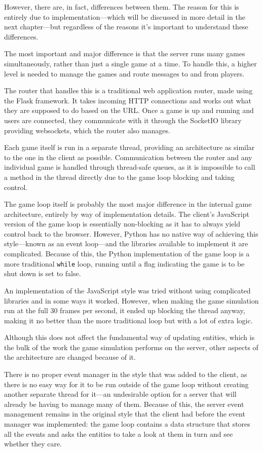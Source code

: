 However, there are, in fact, differences between them. The reason for this is entirely due to implementation---which will be discussed in more detail in the next chapter---but regardless of the reasons it's important to understand these differences.

The most important and major difference is that the server runs many games simultaneously, rather than just a single game at a time. To handle this, a higher level is needed to manage the games and route messages to and from players.

The router that handles this is a traditional web application router, made using the Flask framework. It takes incoming HTTP connections and works out what they are supposed to do based on the URL. Once a game is up and running and users are connected, they communicate with it through the SocketIO library providing websockets, which the router also manages.

Each game itself is run in a separate thread, providing an architecture as similar to the one in the client as possible. Communication between the router and any individual game is handled through thread-safe queues, as it is impossible to call a method in the thread directly due to the game loop blocking and taking control.

The game loop itself is probably the most major difference in the internal game architecture, entirely by way of implementation details. The client's JavaScript version of the game loop is essentially non-blocking as it has to always yield control back to the browser. However, Python has no native way of achieving this style---known as an event loop---and the libraries available to implement it are complicated. Because of this, the Python implementation of the game loop is a more traditional \texttt{while} loop, running until a flag indicating the game is to be shut down is set to false.

An implementation of the JavaScript style was tried without using complicated libraries and in some ways it worked. However, when making the game simulation run at the full 30 frames per second, it ended up blocking the thread anyway, making it no better than the more traditional loop but with a lot of extra logic.

Although this does not affect the fundamental way of updating entities, which is the bulk of the work the game simulation performs on the server, other aspects of the architecture are changed because of it.

There is no proper event manager in the style that was added to the client, as there is no easy way for it to be run outside of the game loop without creating another separate thread for it---an undesirable option for a server that will already be having to manage many of them. Because of this, the server event management remains in the original style that the client had before the event manager was implemented: the game loop contains a data structure that stores all the events and asks the entities to take a look at them in turn and see whether they care.

